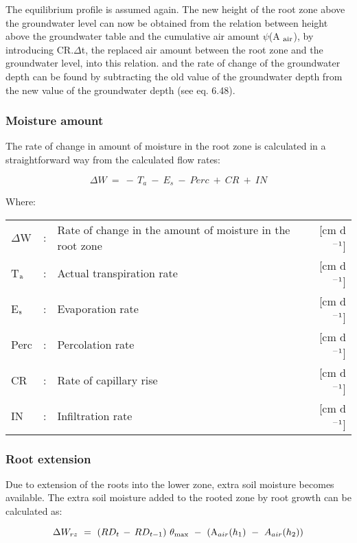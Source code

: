 The equilibrium profile is assumed again. The new height of the root zone above the
groundwater level can now be obtained from the relation between height above the
groundwater table and the cumulative air amount $\psi$(A $_{{\rm air}}$), by introducing CR.$\Delta$t, 
the replaced air amount between the root zone and the groundwater level, into this relation.
and the rate of change of the groundwater depth can be found by subtracting the old value
of the groundwater depth from the new value of the groundwater depth (see eq. 6.48). 

\subsubsection{Moisture amount}
The rate of change in amount of moisture in the root zone is calculated in a straightfor\-ward 
way from the calculated flow rates:

\begin{equation}
\Delta W ~=~ -\, T _{a} ~-~ E _{s} ~-~ Perc ~+~ CR ~+~ IN
\end{equation}

Where:\\[5pt]
\begin{tabularx}{\textwidth}{llXr}
$\Delta$W &:& Rate of change in the amount of moisture in the root zone  & [cm d$^{{\rm -1}}$]\\
T$_{{\rm a}}$ &:& Actual transpiration rate  & [cm d$^{{\rm -1}}$]\\
E$_{{\rm s}}$ &:& Evaporation rate  & [cm d$^{{\rm -1}}$]\\
Perc &:& Percolation rate  & [cm d$^{{\rm -1}}$]\\
CR &:& Rate of capillary rise  & [cm d$^{{\rm -1}}$]\\
IN &:& Infiltration rate  & [cm d$^{{\rm -1}}$]\\
\end{tabularx}

\subsubsection{Root extension}
Due to extension of the roots into the lower zone, extra soil moisture becomes available.
The extra soil moisture added to the rooted zone by root growth can be calculated as:

\begin{equation}
\Delta W_{rz} ~=~(RD _{t} \, -\, RD _{t-1} )~\theta _{\max } ~-~({\rm A} _{air} (h _{1} )~-~A _{air} (h _{2} ))  
\end{equation}

